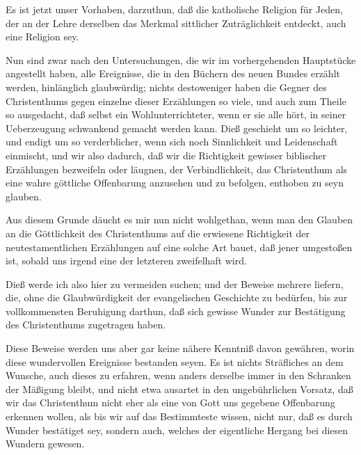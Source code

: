 \begin{aufza}
\begin{aufzb}
\end{aufzb}
\end{aufza}

\clearpage


\begin{aufza}
\item Es ist jetzt unser Vorhaben, darzuthun, daß die katholische Religion für Jeden, der an der Lehre derselben das Merkmal sittlicher Zuträglichkeit entdeckt, auch eine  Religion sey.
\item Nun sind zwar nach den Untersuchungen, die wir im vorhergehenden Hauptstücke angestellt haben, alle Ereignisse, die in den Büchern des neuen Bundes erzählt werden, hinlänglich glaubwürdig; nichts destoweniger haben die Gegner des Christenthums gegen einzelne dieser Erzählungen so viele, und auch zum Theile so  ausgedacht, daß selbst ein Wohlunterrichteter, wenn er sie alle hört, in seiner Ueberzeugung schwankend gemacht werden kann. Dieß geschieht um so leichter, und endigt um so verderblicher, wenn sich noch Sinnlichkeit und Leidenschaft einmischt, und wir also dadurch, daß wir die Richtigkeit gewisser biblischer Erzählungen bezweifeln oder läugnen, der Verbindlichkeit, das Christenthum als eine wahre göttliche Offenbarung anzusehen und zu befolgen, enthoben zu seyn glauben.
\item Aus diesem Grunde däucht es mir nun nicht wohlgethan, wenn man den Glauben an die Göttlichkeit des Christenthums auf die erwiesene Richtigkeit der neutestamentlichen Erzählungen auf eine solche Art bauet, daß jener umgestoßen ist, sobald uns irgend eine der letzteren zweifelhaft wird.~
\item Dieß werde ich also hier zu vermeiden suchen; und der Beweise mehrere liefern, die, ohne die Glaubwürdigkeit der evangelischen Geschichte zu bedürfen, bis zur vollkommensten Beruhigung darthun, daß sich gewisse Wunder zur Bestätigung des Christenthums zugetragen haben.
\item Diese Beweise werden uns aber gar keine nähere Kenntniß davon gewähren, worin diese wundervollen Ereignisse bestanden seyen. Es ist nichts Sträfliches an dem Wunsche, auch dieses zu erfahren, wenn anders derselbe immer in den Schranken der Mäßigung bleibt, und nicht etwa ausartet in den ungebührlichen Vorsatz, daß wir das Christenthum nicht eher als eine von Gott uns gegebene Offenbarung erkennen wollen, als bis wir auf das Bestimmteste wissen, nicht nur, daß es durch Wunder bestätiget sey, sondern auch, welches der eigentliche Hergang bei diesen Wundern gewesen.

\end{aufza}
